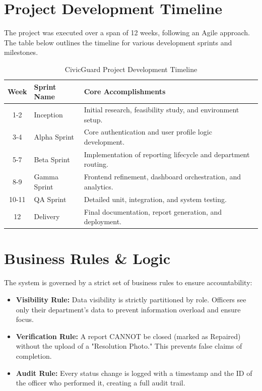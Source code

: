 \section{Project Development Timeline}
The project was executed over a span of 12 weeks, following an Agile approach. The table below outlines the timeline for various development sprints and milestones.

\begin{table}[H]
\centering
\renewcommand{\arraystretch}{1.3}
\begin{tabular}{|c|p{4cm}|p{9cm}|}
\hline
\textbf{Week} & \textbf{Sprint Name} & \textbf{Core Accomplishments} \\ \hline
1-2 & Inception & Initial research, feasibility study, and environment setup. \\ \hline
3-4 & Alpha Sprint & Core authentication and user profile logic development. \\ \hline
5-7 & Beta Sprint & Implementation of reporting lifecycle and department routing. \\ \hline
8-9 & Gamma Sprint & Frontend refinement, dashboard orchestration, and analytics. \\ \hline
10-11 & QA Sprint & Detailed unit, integration, and system testing. \\ \hline
12 & Delivery & Final documentation, report generation, and deployment. \\ \hline
\end{tabular}
\caption{CivicGuard Project Development Timeline}
\label{tab:timeline}
\end{table}

\section{Business Rules \& Logic}
The system is governed by a strict set of business rules to ensure accountability:
\begin{itemize}
    \item \textbf{Visibility Rule:} Data visibility is strictly partitioned by role. Officers see only their department's data to prevent information overload and ensure focus.
    \item \textbf{Verification Rule:} A report CANNOT be closed (marked as Repaired) without the upload of a "Resolution Photo." This prevents false claims of completion.
    \item \textbf{Audit Rule:} Every status change is logged with a timestamp and the ID of the officer who performed it, creating a full audit trail.
\end{itemize}

